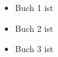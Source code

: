 \documentclass[a4paper,12pt]{article}
\begin{document}
    \begin{itemize}
        \item Buch 1 ist \cite{MR2597943}
        \item Buch 2 ist \cite{MR2446682}
        \item Buch 3 ist \cite{MR895589}
    \end{itemize}

    \newpage
    
     
    
\end{document}
